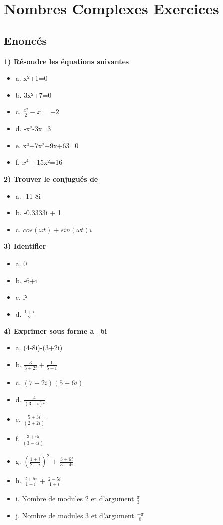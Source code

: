 \newpage

\chapter{Nombres Complexes Exercices}
\vspace{5mm} %
\section{Enoncés}

\vspace{5mm} %
\textbf{1) Résoudre les équations suivantes}

\begin{itemize}
\item {a. x²+1=0}
\item {b. 3x²+7=0}
\item {c. $\frac{x²}{2} -x=-2$}
\item {d. -x²-3x=3}
\item {e. x³+7x²+9x+63=0}
\item {f. $x^{4}$ +15x²=16}
\end{itemize}

\vspace{3mm} %
\textbf{2) Trouver le conjugués de }

\begin{itemize}
\item {a. -11-8i}
\item {b. -0.3333i + 1}
\item {c. $cos(\omega t) + sin(\omega t)i$}
\end{itemize}

\vspace{3mm} %
\textbf{3) Identifier \R $  $ \I}

\begin{itemize}
\item {a. 0}
\item {b. -6+i}
\item {c. i²}
\item {d. $\frac{1+i}{2}$}
\end{itemize}


\vspace{3mm} %
\textbf{4) Exprimer sous forme a+bi}

\begin{itemize}
\item {a. (4-8i)-(3+2i)}
\item {b. $\frac{3}{3+2i} + \frac{1}{5-i}$}
\item {c. $(7-2i)(5+6i)$}
\item {d. $\frac{4}{(3+i)³}$}
\item {e. $\frac{5+3i}{(2+2i)} $}
\item {f. $\frac{3+6i}{(3-4i)} $}
\item {g. $(\frac{1+i}{2-i})^{2}$ + $\frac{3+6i}{3-4i}$}
\item {h. $\frac{2+5i}{1-i}$ + $\frac{2-5i}{1+i}$}
\item {i. Nombre de modules 2 et d'argument $\frac{\pi}{3}$}
\item {j. Nombre de modules 3 et d'argument $\frac{-\pi}{8}$}
\end{itemize}

